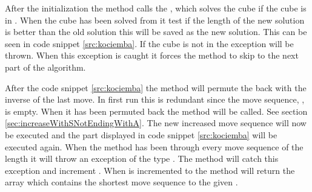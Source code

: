 After the initialization the  method calls the , which solves the cube if the cube is in . 
When the cube has been solved from  it test if the length of the new solution is better than the old solution this will be saved as the new solution. 
This can be seen in code snippet \ref{src:kociemba}.
If the cube is not in   the exception  will be thrown.
When this exception is caught it forces the  method to skip to the next part of the algorithm. 
\begin{comment}
 method to test if the cube is in \m{H}. 
 The method \vr{solveFromH} is called with a parameter, which determines how deep it will search.

If the \rubik{} is in \m{H} then \vr{solveFromH} will start solving it with \m{A} moves. If the \rubik{} is not inside \m{H} the \vr{solveFromH} will throw an exception called \vr{InvalidCubeException}. 

When the InvalidCubeException is caught by it cause 

\end{comment}


After the code snippet \ref{src:kociemba} the method will permute the \rubik{} back with the inverse of the last move. In first run this is redundant since the move sequence, , is empty. 
When it has been permuted back the method  will be called. 
See section \ref{sec:increaseWithSNotEndingWithA}. 
The new increased move sequence will now be executed and the part displayed in code snippet \ref{src:kociemba} will be executed again. 
When the method  has been through every move sequence of the length  it will throw an exception of the type  . 
The  method will catch this exception and increment . When  is incremented to  the method will return the array  which contains the shortest move sequence to the given \rubik{}.  
\begin{comment}
Thereafter it tests if \vr{d + c.length} > \vr{l}. 
If that is true, \vr{l} will be set equal to the sum of \vr{d + c.length} and the \vr{result} array will be initialized with the size \vr{l}. 
In the \vr{result} array the move sequence \vr{b} and the move sequence \vr{c} is added and the console will print the current \vr{result} and the time it took in seconds.

After the method has tested if \vr{d + c.length < l} the method will permute the \rubik{} back with the inverse of the last move. When it has been permuted the method \vr{increaseWithSNotEndingWithA} will be called. See section \ref{sec:increaseWithSNotEndingWithA}.

When the method \vr{increaseWithSNotEndingWithA} throws an exception of the type \vr{UnableToIncreaseMoveSequenceException} the method increments \vr{d}. 
When \vr{d} is incremented to \vr{l} the method will return the \vr{result} array.
\end{comment}
